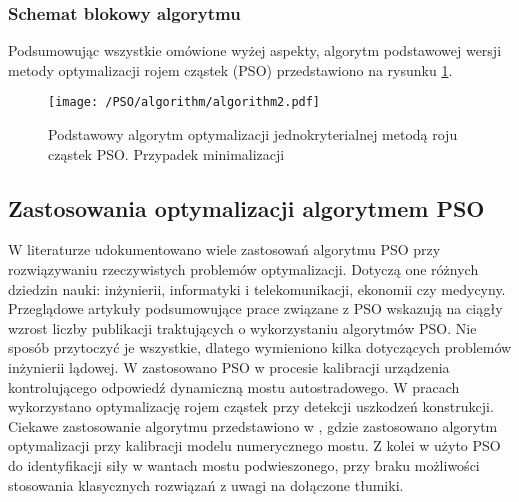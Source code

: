 \subsubsection{Schemat blokowy algorytmu}
Podsumowując wszystkie omówione wyżej aspekty, algorytm podstawowej wersji metody optymalizacji rojem cząstek (PSO) przedstawiono na rysunku \ref{fig: pso_single_algorith}.

\begin{figure}[H]
	\centering
	\texttt{[image: /PSO/algorithm/algorithm2.pdf]} 
	\captionsetup{justification=centering}
	\caption{Podstawowy algorytm optymalizacji jednokryterialnej metodą roju cząstek PSO. Przypadek minimalizacji}
	\label{fig: pso_single_algorith}
\end{figure}


\subsection{Zastosowania optymalizacji algorytmem PSO}
W literaturze udokumentowano wiele zastosowań algorytmu PSO przy rozwiązywaniu rzeczywistych problemów optymalizacji. Dotyczą one różnych dziedzin nauki: inżynierii, informatyki i telekomunikacji, ekonomii czy medycyny. Przeglądowe artykuły podsumowujące prace związane z PSO \cite{Atyabi2011,CoelloCoello2006,Lalwani2013} wskazują na ciągły wzrost liczby publikacji traktujących o wykorzystaniu algorytmów PSO. Nie sposób przytoczyć je wszystkie, dlatego wymieniono kilka dotyczących problemów inżynierii lądowej. W \cite{Hughes2018} zastosowano PSO w procesie kalibracji urządzenia kontrolującego odpowiedź dynamiczną mostu autostradowego. W pracach \cite{Seyedpoor2011,Kang2012,Wei2018} wykorzystano optymalizację rojem cząstek przy detekcji uszkodzeń konstrukcji. Ciekawe zastosowanie algorytmu przedstawiono w \cite{Tran-Ngoc2018,Qin2018}, gdzie zastosowano algorytm optymalizacji przy kalibracji modelu numerycznego mostu. Z kolei w \cite{Dan2015} użyto PSO do identyfikacji siły w wantach mostu podwieszonego, przy braku możliwości stosowania klasycznych rozwiązań z uwagi na dołączone tłumiki.

